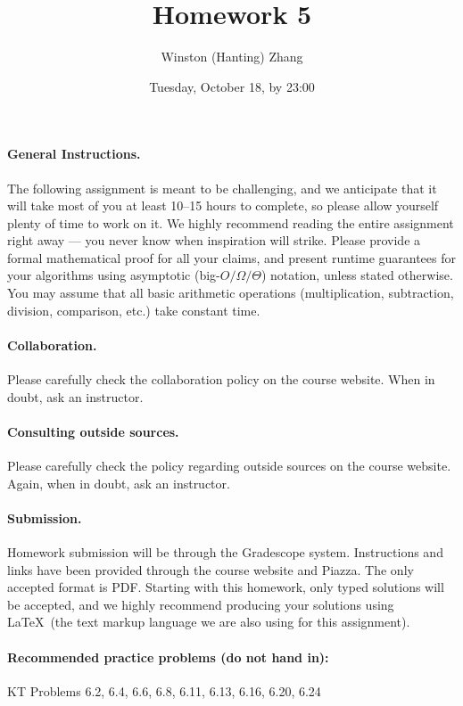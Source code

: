 \documentclass[10pt]{article}
\title{\bf Homework 5}
\author{Winston (Hanting) Zhang}
\date{Tuesday, October 18, by 23:00}
\begin{document}
\maketitle

\paragraph{General Instructions.} The following assignment is meant to be challenging, and we anticipate that it will take most of you at least 10--15 hours to complete, so please allow yourself plenty of time to work on it.
We highly recommend reading the entire assignment right away --- you never know when inspiration will strike.
Please provide a formal mathematical proof for all your claims, and  present runtime guarantees for your algorithms using asymptotic (big-$O/\Omega/\Theta$) notation, unless stated otherwise. You may assume that all basic arithmetic operations (multiplication, subtraction, division, comparison, etc.) take constant time. %

\paragraph{Collaboration.}  Please carefully check the collaboration policy on the course website. When in doubt, ask an instructor.

\paragraph{Consulting outside sources.} Please carefully check the policy regarding outside sources on the course website. Again, when in doubt, ask an instructor.

\paragraph{Submission.} Homework submission will be through the Gradescope system. Instructions and links have been provided through the course website and Piazza. The only accepted format is PDF. Starting with this homework, only typed solutions will be accepted, and we highly recommend producing your solutions using \LaTeX~(the text markup language we are also using for this assignment).

\paragraph{Recommended practice problems (do not hand in):} KT Problems 6.2, 6.4, 6.6, 6.8, 6.11, 6.13, 6.16, 6.20, 6.24
\end{document}
